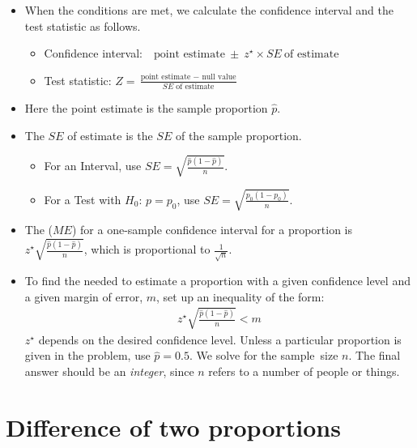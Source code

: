 \begin{itemize}
\item When the conditions are met, we calculate the confidence interval and the test statistic as follows.
\begin{itemize}
\item[] Confidence interval:\ \  $\text{point estimate}\ \pm\ z^{\star} \times SE\ \text{of estimate}$
\item[] Test statistic: $Z = \frac{\text{point estimate } - \text{ null value}}{SE \text{ of estimate}}$ 
\end{itemize}
\item[] Here the point estimate is the sample proportion $\hat{p}$.
\item[] The $SE$ of estimate is the $SE$ of the sample proportion.  
\vspace{-1mm}
\begin{itemize}
\setlength{\itemsep}{0mm}
\item For an Interval, use $SE = \sqrt{\frac{\hat{p}(1-\hat{p})}{n}}$.
\item For a Test with $H_0$: $p=p_0$, use $SE = \sqrt{\frac{p_0(1-p_0)}{n}}$.
\end{itemize}

\item The  ($ME$) for a one-sample confidence interval for a proportion is $z^{\star}\sqrt{\frac{\hat{p}(1-\hat{p})}{n}}$, which is proportional to $\frac{1}{\sqrt{n}}$.  

\item To find the  needed to estimate a proportion with a given confidence level and a given margin of error, $m$, set up an inequality of the form:
\begin{align*}
z^{\star}\sqrt{\frac{\hat{p}(1-\hat{p})}{n}}<m
\end{align*}
$z^{\star}$ depends on the desired confidence level.  Unless a particular proportion is given in the problem, use \mbox{$\hat{p}=0.5$.}  We solve for the sample~size $n$.  The final answer should be an \textit{integer}, since $n$ refers to a number of people or things.
\end{itemize}


{}



\section[Difference of two proportions]{Difference of two proportions }
\label{differenceOfTwoProportions}


